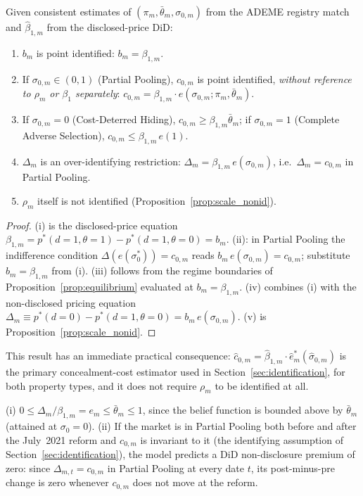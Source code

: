 \begin{proposition}
\label{prop:what_identified}
Given consistent estimates of $(\pi_m,\bar\theta_m,\sigma_{0,m})$ from the ADEME registry match
and $\hat\beta_{1,m}$ from the disclosed-price DiD:
\begin{enumerate}[label=(\roman*)]
    \item $b_m$ is point identified: $b_m=\beta_{1,m}$.
    \item If $\sigma_{0,m}\in(0,1)$ (Partial Pooling), $c_{0,m}$ is point identified,
        \emph{without reference to $\rho_m$ or $\beta_1$ separately}:
        $c_{0,m}=\beta_{1,m}\cdot e(\sigma_{0,m};\pi_m,\bar\theta_m)$.
    \item If $\sigma_{0,m}=0$ (Cost-Deterred Hiding), $c_{0,m}\ge\beta_{1,m}\bar\theta_m$; if
        $\sigma_{0,m}=1$ (Complete Adverse Selection), $c_{0,m}\le\beta_{1,m}\,e(1)$.
    \item $\Delta_m$ is an over-identifying restriction: $\Delta_m=\beta_{1,m}\,e(\sigma_{0,m})$,
        i.e.\ $\Delta_m=c_{0,m}$ in Partial Pooling.
    \item $\rho_m$ itself is not identified (Proposition~\ref{prop:scale_nonid}).
\end{enumerate}
\end{proposition}

\begin{proof}
(i) is the disclosed-price equation $\beta_{1,m}=p^*(d=1,\theta=1)-p^*(d=1,\theta=0)=b_m$.
(ii): in Partial Pooling the indifference condition
$\Delta(e(\sigma_0^*))=c_{0,m}$ reads $b_m\,e(\sigma_{0,m})=c_{0,m}$; substitute $b_m=\beta_{1,m}$
from (i). (iii) follows from the regime boundaries of Proposition~\ref{prop:equilibrium}
evaluated at $b_m=\beta_{1,m}$. (iv) combines (i) with the non-disclosed pricing equation
$\Delta_m\equiv p^*(d=0)-p^*(d=1,\theta=0)=b_m\,e(\sigma_{0,m})$. (v) is
Proposition~\ref{prop:scale_nonid}.
\end{proof}

This result has an immediate practical consequence: $\hat c_{0,m}=\hat\beta_{1,m}\cdot\hat
e^*_m(\hat\sigma_{0,m})$ is the primary concealment-cost estimator used in
Section~\ref{sec:identification}, for both property types, and it does not require $\rho_m$ to
be identified at all.

\begin{lemma}
\label{lem:model_bounds}
(i) $0\le\Delta_m/\beta_{1,m}=e_m\le\bar\theta_m\le1$, since the belief function is bounded
above by $\bar\theta_m$ (attained at $\sigma_0=0$). (ii) If the market is in Partial Pooling both before and after the July~2021 reform and $c_{0,m}$ is
invariant to it (the identifying assumption of
Section~\ref{sec:identification}), the model predicts a DiD non-disclosure premium of zero:
since $\Delta_{m,t}=c_{0,m}$ in Partial Pooling at every date $t$, its post-minus-pre change is
zero whenever $c_{0,m}$ does not move at the reform.
\end{lemma}


